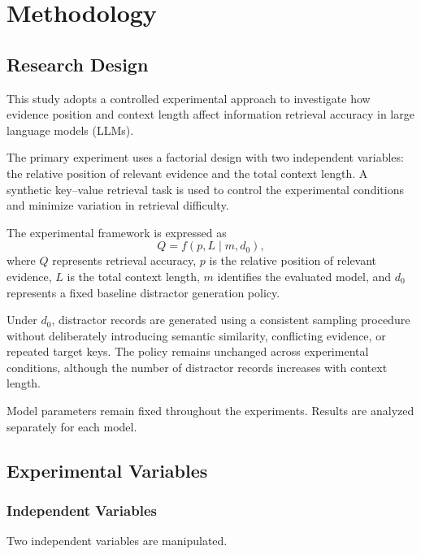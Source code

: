 
\section{Methodology}
\label{sec:methodology}

\subsection{Research Design}
\label{subsec:research-design}

This study adopts a controlled experimental approach to
investigate how evidence position and context length affect
information retrieval accuracy in large language models (LLMs).

The primary experiment uses a factorial design with two
independent variables: the relative position of relevant
evidence and the total context length. A synthetic key--value
retrieval task is used to control the experimental conditions
and minimize variation in retrieval difficulty.

The experimental framework is expressed as
\begin{equation}
    Q = f(p,L \mid m,d_0),
    \label{eq:primary-framework}
\end{equation}
where $Q$ represents retrieval accuracy, $p$ is the relative
position of relevant evidence, $L$ is the total context
length, $m$ identifies the evaluated model, and $d_0$
represents a fixed baseline distractor generation policy.

Under $d_0$, distractor records are generated using a
consistent sampling procedure without deliberately
introducing semantic similarity, conflicting evidence,
or repeated target keys. The policy remains unchanged
across experimental conditions, although the number
of distractor records increases with context length.

Model parameters remain fixed throughout the experiments.
Results are analyzed separately for each model.

\subsection{Experimental Variables}
\label{subsec:variables}

\subsubsection{Independent Variables}

Two independent variables are manipulated.

